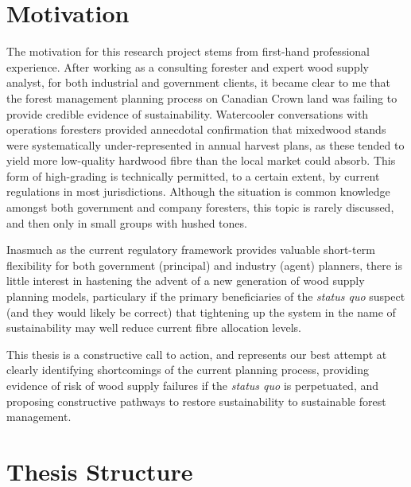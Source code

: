 \section{Motivation}

The motivation for this research project stems from first-hand professional experience. After working as a consulting forester and expert wood supply analyst, for both industrial and government clients, it became clear to me that the forest management planning process on Canadian Crown land was failing to provide credible evidence of sustainability. Watercooler conversations with operations foresters provided annecdotal confirmation that mixedwood stands were systematically under-represented in annual harvest plans, as these tended to yield more low-quality hardwood fibre than the local market could absorb. This form of high-grading is technically permitted, to a certain extent, by current regulations in most jurisdictions. Although the situation is common knowledge amongst both government and company foresters, this topic is rarely discussed, and then only in small groups with hushed tones. 

Inasmuch as the current regulatory framework provides valuable short-term flexibility for both government (principal) and industry (agent) planners, there is little interest in hastening the advent of a new generation of wood supply planning models, particulary if the primary beneficiaries of the \emph{status quo} suspect (and they would likely be correct) that tightening up the system in the name of sustainability may well reduce current fibre allocation levels.  


This thesis is a constructive call to action, and represents our best attempt at clearly identifying shortcomings of the current planning process, providing evidence of risk of wood supply failures if the \emph{status quo} is perpetuated, and proposing constructive pathways to restore sustainability to sustainable forest management. 

\section{Thesis Structure}

